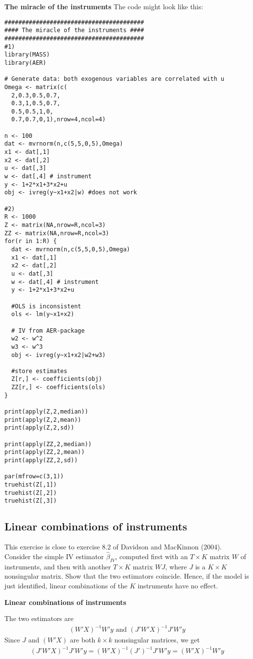 \documentclass{article}
\begin{document}
\begin{solution}
\textbf{The miracle of the instruments}
The code might look like this:
\begin{verbatim}
########################################
#### The miracle of the instruments ####
########################################
#1)
library(MASS)
library(AER)

# Generate data: both exogenous variables are correlated with u
Omega <- matrix(c(
  2,0.3,0.5,0.7,
  0.3,1,0.5,0.7,
  0.5,0.5,1,0,
  0.7,0.7,0,1),nrow=4,ncol=4)

n <- 100
dat <- mvrnorm(n,c(5,5,0,5),Omega)
x1 <- dat[,1]
x2 <- dat[,2]
u <- dat[,3]
w <- dat[,4] # instrument
y <- 1+2*x1+3*x2+u
obj <- ivreg(y~x1+x2|w) #does not work

#2)
R <- 1000
Z <- matrix(NA,nrow=R,ncol=3)
ZZ <- matrix(NA,nrow=R,ncol=3)
for(r in 1:R) {
  dat <- mvrnorm(n,c(5,5,0,5),Omega)
  x1 <- dat[,1]
  x2 <- dat[,2]
  u <- dat[,3]
  w <- dat[,4] # instrument
  y <- 1+2*x1+3*x2+u

  #OLS is inconsistent
  ols <- lm(y~x1+x2)

  # IV from AER-package
  w2 <- w^2
  w3 <- w^3
  obj <- ivreg(y~x1+x2|w2+w3)

  #store estimates
  Z[r,] <- coefficients(obj)
  ZZ[r,] <- coefficients(ols)
}

print(apply(Z,2,median))
print(apply(Z,2,mean))
print(apply(Z,2,sd))

print(apply(ZZ,2,median))
print(apply(ZZ,2,mean))
print(apply(ZZ,2,sd))

par(mfrow=c(3,1))
truehist(Z[,1])
truehist(Z[,2])
truehist(Z[,3])
\end{verbatim}
\end{solution}

\subsection{Linear combinations of instruments}

This exercise is close to exercise 8.2 of Davidson and MacKinnon (2004).
Consider the simple IV estimator $\hat{\beta}_{IV}$, computed first with an $%
T\times K$ matrix $W$ of instruments, and then with another $T\times K$
matrix $WJ$, where $J$ is a $K\times K$ nonsingular matrix. Show that the
two estimators coincide. Hence, if the model is just identified, linear
combinations of the $K$ instruments have no effect.

\begin{solution}
\textbf{Linear combinations of instruments}

The two estimators are
\begin{align*}
(W'X)^{-1}W'y \text{ and } (J'W'X)^{-1}J'W'y
\end{align*}
Since $J$ and $(W'X)$ are both $k\times k$ nonsingular matrices, we get
\begin{align*}
(J'W'X)^{-1}J'W'y = (W'X)^{-1}(J')^{-1}J'W'y = (W'X)^{-1}W'y
\end{align*}
\end{solution}
\end{document}
